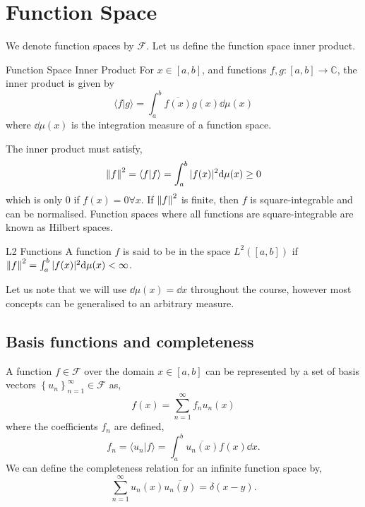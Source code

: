 \documentclass{book}
\renewcommand{\braket}[2]{\langle#1|#2\rangle}
\begin{document}
\section{Function Space}
We denote function spaces by $\mathcal{F}$. Let us define the function space inner product.
\begin{Definitions}{Function Space Inner Product}{}
	For $x \in \left[a,b\right]$, and functions $f,g : \left[a,b\right] \to \mathbb{C}$, the inner product is given by
	\begin{equation}
		\braket{f}{g} = \int_a^b\overline{f(x)}g(x)\dd\mu(x)
	\end{equation}
	where $\dd\mu(x)$ is the integration measure of a function space.
\end{Definitions}
The inner product must satisfy,
\begin{equation}
	\norm{f}^2 = \braket{f}{f} = \int_a^b |f(x)|^2\dd\mu(x) \geq 0
\end{equation}
which is only 0 if $f(x) = 0 \forall x$. If $\norm{f}^2$ is finite, then $f$ is square-integrable and can be normalised. Function spaces where all functions are square-integrable are known as Hilbert spaces.
\begin{Definitions}{L2 Functions}{}
	A function $f$ is said to be in the space $L^2(\left[a,b\right])$ if $\norm{f}^2 = \int_a^b|f(x)|^2\dd\mu(x) < \infty$.
\end{Definitions}
Let us note that we will use $\dd\mu(x) = \dd{x}$ throughout the course, however most concepts can be generalised to an arbitrary measure.
\subsection{Basis functions and completeness}
A function $f \in \mathcal{F}$ over the domain $x \in \left[a,b\right]$ can be represented by a set of basis vectors $\left\{u_n\right\}_{n=1}^{\infty} \in \mathcal{F}$ as,
\begin{equation}
	f(x) = \sum_{n=1}^{\infty}f_nu_n(x)
\end{equation}
where the coefficients $f_n$ are defined,
\begin{equation}
	f_n = \braket{u_n}{f} = \int_a^b\overline{u_n(x)}f(x)\dd{x}.
\end{equation}
We can define the completeness relation for an infinite function space by,
\begin{equation}
	\sum_{n=1}^{\infty}u_n(x) \overline{u_n(y)} = \delta(x-y).
\end{equation}
\end{document}
